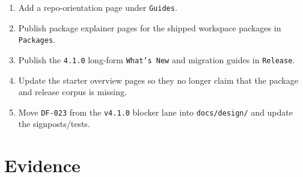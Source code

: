 \begin{enumerate}
\def\labelenumi{\arabic{enumi}.}
\tightlist
\item
  Add a repo-orientation page under \texttt{G\allowbreak{}u\allowbreak{}i\allowbreak{}d\allowbreak{}e\allowbreak{}s}.
\item
  Publish package explainer pages for the shipped workspace packages in \texttt{P\allowbreak{}a\allowbreak{}c\allowbreak{}k\allowbreak{}a\allowbreak{}g\allowbreak{}e\allowbreak{}s}.
\item
  Publish the \texttt{4\allowbreak{}.\allowbreak{}1\allowbreak{}.\allowbreak{}0} long-form \texttt{W\allowbreak{}h\allowbreak{}a\allowbreak{}t\allowbreak{}'\allowbreak{}s\allowbreak{} \allowbreak{}N\allowbreak{}e\allowbreak{}w} and migration guides in \texttt{R\allowbreak{}e\allowbreak{}l\allowbreak{}e\allowbreak{}a\allowbreak{}s\allowbreak{}e}.
\item
  Update the starter overview pages so they no longer claim that the package and release corpus is missing.
\item
  Move \texttt{D\allowbreak{}F\allowbreak{}-\allowbreak{}0\allowbreak{}2\allowbreak{}3} from the \texttt{v\allowbreak{}4\allowbreak{}.\allowbreak{}1\allowbreak{}.\allowbreak{}0} blocker lane into \texttt{d\allowbreak{}o\allowbreak{}c\allowbreak{}s\allowbreak{}/\allowbreak{}d\allowbreak{}e\allowbreak{}s\allowbreak{}i\allowbreak{}g\allowbreak{}n\allowbreak{}/} and update the signposts/tests.
\end{enumerate}

\section{Evidence}\label{record-084-evidence}

